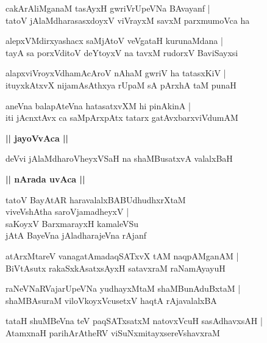 \documentclass[twoside,12pt,openright]{book}
\newcounter{shloka}[chapter]
\def\uvaca#1{\centerline{{\large\textbf{#1}}}}
\begin{document}
\begin{shloka}%
cakArAliMganaM tasAyxH gwriVrUpeVNa BAvayanf |\\
tatoV jAlaMdharasasxdoyxV viVrayxM savxM parxmumoVca ha 
\end{shloka}

\begin{shloka}%
alepxVMdirxyashacx saMjAtoV veVgataH kurunaMdana |\\
tayA sa porxVditoV deYtoyxV na tavxM rudorxV BaviSayxsi
\end{shloka}

\begin{shloka}%
alapxviVroyxVdhamAcAroV nAhaM gwriV ha tatasxKiV |\\
ituyxkAtxvX nijamAsAthxya rUpaM sA pArxhA taM punaH 
\end{shloka}

\begin{shloka}%
aneVna balapAteVna hatasatxvXM hi pinAkinA |\\
iti jAcnxtAvx ca saMpArxpAtx tatarx gatAvxbarxviVdumAM 
\end{shloka}

\uvaca{|| jayoVvAca ||}

\begin{shloka}%
deVvi jAlaMdharoVheyxVSaH na shaMBusatxvA valalxBaH 
\end{shloka}

\uvaca{|| nArada uvAca ||}

\begin{shloka}%
tatoV BayAtAR haravalalxBABUdhudhxrXtaM \\
viveVshAtha saroVjamadheyxV |\\
saKoyxV BarxmarayxH kamaleVSu \\
jAtA BayeVna jAladharajeVna rAjanf 
\end{shloka}

\begin{shloka}%
atArxMtareV vanagatAmadaqSATxvX tAM naqpAMganAM |\\
BiVtAsutx rakaSxkAsatxsAyxH satavxraM raNamAyayuH
\end{shloka}

\begin{shloka}%
raNeVNaRVajarUpeVNa yudhayxMtaM shaMBunAduBxtaM |\\
shaMBAsuraM viloVkoyxVcusetxV haqtA rAjavalalxBA
\end{shloka}

\begin{shloka}%
tataH shuMBeVna teV paqSATxsatxM natovxVcuH sasAdhavxsAH |\\
AtamxnaH parihArAtheRV viSuNxmitayxsereVshavxraM
\end{shloka}
\end{document}
